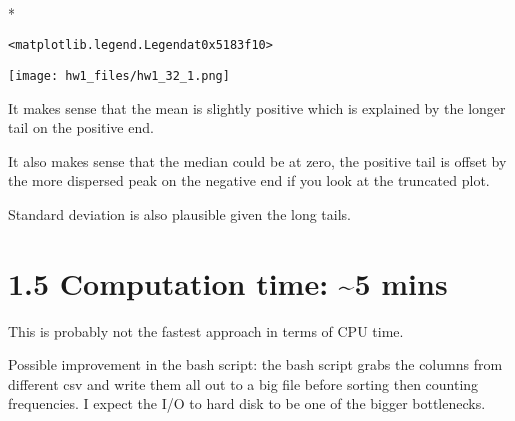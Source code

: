 \documentclass[letterpaper,10pt,english]{/usr/local/lib/python2.7/dist-packages/sphinx/texinputs/sphinxhowto}
\def\smaller{\fontsize{9.5pt}{9.5pt}\selectfont}
\newenvironment{InvisibleVerbatim}
        {\begin{mdframed}[leftmargin=0.1\linewidth,innerleftmargin=3pt,innerrightmargin=3pt, userdefinedwidth=1\linewidth, linewidth=0pt, linecolor=white, usetwoside=false]}
        {\end{mdframed}}
\begin{document}
    

        
        

            
                \makebox[0.1\linewidth]{\smaller\hfill\tt\color{nbframe-out-prompt}Out\hspace{4pt}{[}35{]}:\hspace{4pt}}\\*
                \vspace{-2.55\baselineskip}\begin{InvisibleVerbatim}
                \vspace{-0.5\baselineskip}
\begin{alltt}<matplotlib.legend.Legend at 0x5183f10>\end{alltt}

            \end{InvisibleVerbatim}
            
                \begin{InvisibleVerbatim}
                \vspace{-0.5\baselineskip}
    \begin{center}
    \texttt{[image: hw1\_files/hw1\_32\_1.png]}
    \par
    \end{center}
    
            \end{InvisibleVerbatim}
            
        
    
It makes sense that the mean is slightly positive which is explained by
the longer tail on the positive end.

It also makes sense that the median could be at zero, the positive tail
is offset by the more dispersed peak on the negative end if you look at
the truncated plot.

Standard deviation is also plausible given the long tails.\section{1.5 Computation time: \textasciitilde{}5 mins}This is probably not the fastest approach in terms of CPU time.

Possible improvement in the bash script: the bash script grabs the
columns from different csv and write them all out to a big file before
sorting then counting frequencies. I expect the I/O to hard disk to be
one of the bigger bottlenecks.
\end{document}
